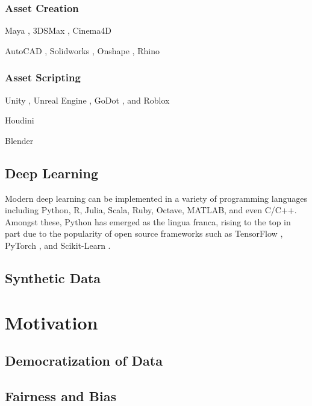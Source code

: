 \documentclass{article}
\begin{document}
\subsubsection{Asset Creation}

Maya \citep{maya}, 3DSMax \citep{3dsmax}, Cinema4D \citep{cinema4d}

AutoCAD \citep{autocad}, Solidworks \citep{solidworks}, Onshape \citep{onshape}, Rhino \citep{rhino}

\subsubsection{Asset Scripting}

Unity \citep{unity3d}, Unreal Engine \citep{unrealengine}, GoDot \citep{godot}, and Roblox \citep{roblox}

Houdini \citep{houdini}

Blender \citep{blender}

\subsection{Deep Learning}

Modern deep learning can be implemented in a variety of programming languages including Python, R, Julia,
 Scala, Ruby, Octave, MATLAB, and even C/C++. Amongst these, Python has emerged as the lingua franca,
  rising to the top in part due to the popularity of open source frameworks such as
  TensorFlow \citep{tensorflow}, PyTorch \citep{pytorch}, and Scikit-Learn \citep{scikit-learn}.

\subsection{Synthetic Data}
\lipsum[5]

\section{Motivation}
\label{sec:motivation}

\subsection{Democratization of Data}
\lipsum[2]

\subsection{Fairness and Bias}
\lipsum[2]
\end{document}
